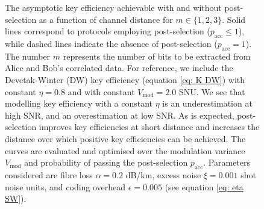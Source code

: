 ﻿\documentclass[12pt]{article}
\begin{document}
\begin{figure}[t]
  \caption{The asymptotic key efficiency achievable with and without post-selection as a function of channel distance for $m \in \{1,2,3\}$. Solid lines correspond to protocols employing post-selection ($p_\text{acc} \leq 1$), while dashed lines indicate the absence of post-selection ($p_\text{acc} = 1$). The number $m$ represents the number of bits to be extracted from Alice and Bob's correlated data. For reference, we include the Devetak-Winter (DW) key efficiency (equation \eqref{eq: K DW}) with constant $\eta = 0.8$ and with constant $V_\text{mod} = 2.0$ SNU. We see that modelling key efficiency with a constant $\eta$ is an underestimation at high SNR, and an overestimation at low SNR. As is expected, post-selection improves key efficiencies at short distance and increases the distance over which positive key efficiencies can be achieved. The curves are evaluated and optimised over the modulation variance $V_\text{mod}$ and probability of passing the post-selection $p_\text{acc}$. Parameters considered are fibre loss $\alpha = 0.2$ dB/km, excess noise $\xi = 0.001$ shot noise units, and coding overhead $\epsilon = 0.005$ (see equation \eqref{eq: eta SW}).}
  \label{fig:key-per-pulse-post-vs-no-post}
\end{figure}
\end{document}
